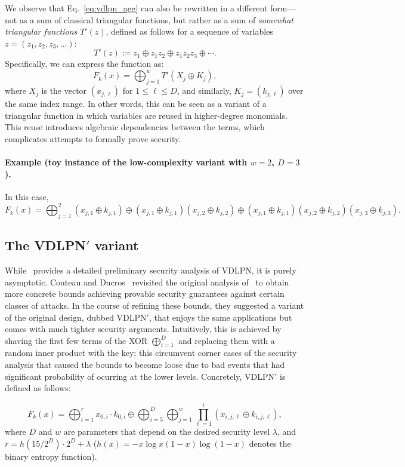 \documentclass[journal=tosc,submission]{iacrtrans}
\theoremstyle{theorem}
\renewcommand\secpar{\ensuremath{\lambda}\xspace}
\begin{document}
We observe that Eq.~\eqref{eq:vdlpn_agg} can also be rewritten in a different form—not as a sum of classical triangular functions, but rather as a sum of \emph{somewhat triangular functions} \( T'(z) \), defined as follows for a sequence of variables \( z = (z_1, z_2, z_3, \dots) \):
\[
    T'(z) := z_1 \oplus z_1 z_2 \oplus z_1 z_2 z_3 \oplus \cdots.
\]
Specifically, we can express the function as:
\[
    F_k(x) = \bigoplus_{j=1}^w T'(X_j \oplus K_j),
\]
where \( X_j \) is the vector \( (x_{j,\ell}) \) for \( 1 \leq \ell \leq D \), and similarly, \( K_j = (k_{j,\ell}) \) over the same index range. In other words, this can be seen as a variant of a triangular function in which variables are reused in higher-degree monomials.  This reuse introduces algebraic dependencies between the terms, which complicates attempts to formally prove security.


\paragraph{Example (toy instance of the low-complexity variant with $w = 2$, $D = 3$).}
In this case, 
\[
F_k(x) = \bigoplus_{j = 1}^2 (x_{j,1} \oplus k_{j,1}) \oplus (x_{j,1}\oplus k_{j,1})(x_{j,2} \oplus k_{j,2}) \oplus (x_{j,1}\oplus k_{j,1})(x_{j,2}\oplus k_{j,2})(x_{j,3}\oplus k_{j,3}).
\]

\subsection{The {\sf VDLPN}$'$ variant}

While~\cite{FOCS:BCGIKS20} provides a detailed preliminary security analysis of {\sf VDLPN}, it is purely asymptotic. Couteau and Ducros~\cite{PKC:CouDuc23} revisited the original analysis of~\cite{FOCS:BCGIKS20} to obtain more concrete bounds achieving provable security guarantees against certain classes of attacks. In the course of refining these bounds, they suggested a variant of the original design, dubbed {\sf VDLPN}$'$, that enjoys the same applications but comes with much tighter security arguments. Intuitively, this is achieved by shaving the first few terms of the XOR $\bigoplus_{i=1}^D$ and replacing them with a random inner product with the key; this circumvent corner cases of the security analysis that caused the bounds to become loose due to bad events that had significant probability of ocurring at the lower levels. Concretely, {\sf VDLPN}$'$ is defined as follows:

\begin{equation} \label{eq:vdlpn*}
    F_k(x) = \bigoplus_{i=1}^{r} x_{0,i}\cdot k_{0,i} \oplus \bigoplus_{i=5}^D \bigoplus_{j=1}^w \prod_{\ell=1}^i \left(x_{i,j,\ell} \oplus k_{i,j,\ell}\right),
\end{equation}
where $D$ and $w$ are parameters that depend on the desired security level $\lambda$, and $r = h(15/2^D)\cdot 2^D + \secpar$ ($h(x) = -x\log x (1-x)\log(1-x)$ denotes the binary entropy function). 
\end{document}
